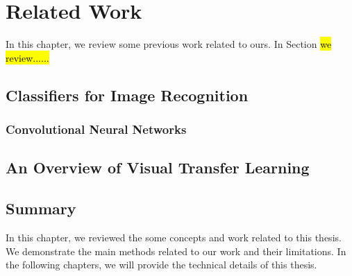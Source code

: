 \chapter{Related Work}\label{sec:works}
In this chapter, we review some previous work related to ours. In Section \hl{we review......}
\section{Classifiers for Image Recognition}\label{sec:relat:linear}

\subsection{Convolutional Neural Networks}

\section{An Overview of Visual Transfer Learning}

\section{Summary}
In this chapter, we reviewed the some concepts and work related to this thesis. We demonstrate the main methods related to our work and their limitations. In the following chapters, we will provide the technical details of this thesis. 
